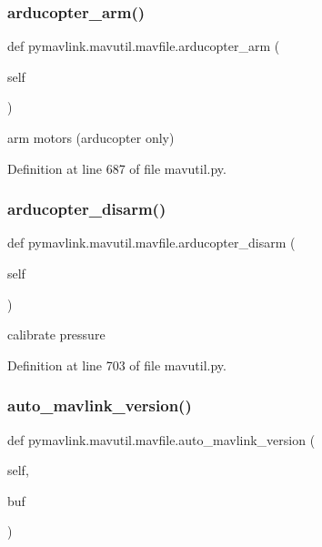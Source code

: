 \subsubsection{\texorpdfstring{arducopter\_arm()}{arducopter\_arm()}}
{\footnotesize\ttfamily def pymavlink.\+mavutil.\+mavfile.\+arducopter\+\_\+arm (\begin{DoxyParamCaption}\item[{}]{self }\end{DoxyParamCaption})}

\begin{DoxyVerb}arm motors (arducopter only)\end{DoxyVerb}
 

Definition at line 687 of file mavutil.\+py.

\mbox{\label{classpymavlink_1_1mavutil_1_1mavfile_affeb5fa286a50594954bd0e15c43718e}} 
\subsubsection{\texorpdfstring{arducopter\_disarm()}{arducopter\_disarm()}}
{\footnotesize\ttfamily def pymavlink.\+mavutil.\+mavfile.\+arducopter\+\_\+disarm (\begin{DoxyParamCaption}\item[{}]{self }\end{DoxyParamCaption})}

\begin{DoxyVerb}calibrate pressure\end{DoxyVerb}
 

Definition at line 703 of file mavutil.\+py.

\mbox{\label{classpymavlink_1_1mavutil_1_1mavfile_af0f0faf1986ca88353787674f7575862}} 
\subsubsection{\texorpdfstring{auto\_mavlink\_version()}{auto\_mavlink\_version()}}
{\footnotesize\ttfamily def pymavlink.\+mavutil.\+mavfile.\+auto\+\_\+mavlink\+\_\+version (\begin{DoxyParamCaption}\item[{}]{self,  }\item[{}]{buf }\end{DoxyParamCaption})}

